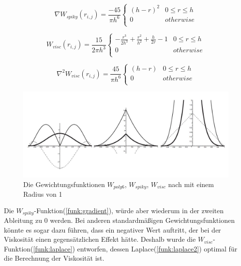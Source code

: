 \documentclass[intern,palatino]{cgBA}
\begin{document}
\begin{equation}\label{funk:gradient2}
\nabla W_{spiky}(r_{i,j}) = \frac{-45}{\pi h^6}   
\begin{cases}
(h - r)^2 		& 0	\leq r \leq h	\\
0					& otherwise			\\
\end{cases}
\end{equation}

\begin{equation}\label{funk:laplace}
W_{visc}(r_{i,j}) = \frac{15}{2 \pi h^3}   
\begin{cases}
-\frac{r^3}{2h^3} + \frac{r^2}{h^2} + \frac{h}{2r} -1  		& 0	\leq r \leq h	\\
0					& otherwise			\\
\end{cases}
\end{equation}

\begin{equation}\label{funk:laplace2}
\nabla ^2 W_{visc}(r_{i,j}) = \frac{45}{\pi h^6}
\begin{cases}
(h-r) 		& 0	\leq r \leq h	\\
0					& otherwise			\\
\end{cases}
\end{equation}

\begin{figure}[h]
	\centering
	\includegraphics[width=0.7\columnwidth]{Bilder/kernel.jpg}
	\caption{Die Gewichtungsfunktionen $W_{poly6}$, $W_{spiky}$, $W_{visc}$ nach \cite{muller2003particle} mit einem Radius von 1}
	\label{img:kernel}
\end{figure}
Die $W_{spiky}$-Funktion(\ref{funk:gradient}), würde aber wiederum in der zweiten Ableitung zu 0 werden. Bei anderen standardmäßigen Gewichtungsfunktionen könnte es sogar dazu führen, dass ein negativer Wert auftritt, der bei der Viskosität einen gegensätzlichen Effekt hätte. Deshalb wurde die $W_{visc}$-Funktion(\ref{funk:laplace}) entworfen, dessen Laplace(\ref{funk:laplace2}) optimal für die Berechnung der Viskosität ist.
\newline
\end{document}
